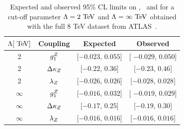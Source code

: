 \begin{table}\centering 
\begin{tabular}{cccc}
\hline
 $\Lambda [\TeV]$ & Coupling & Expected  & Observed \\
\hline
2 	& $g_1^Z$ 		& [$-0.023$, $0.055$]  & [ $-0.029$, $0.050$] \\
2 	& $\Delta \kappa_Z$ 	& [$-0.22$, $0.36$]    & [$-0.23$, $0.46$] \\
2 	& $\lambda_Z$ 	& [$-0.026$, $0.026$]  & [$-0.028$, $0.028$] \\
$\infty$ 	& $g_1^Z$ 		& [$-0.016$, $0.032$]  & [ $-0.019$, $0.029$] \\
$\infty$ 	& $\Delta \kappa_Z$ 	& [$-0.17$, $0.25$]    & [$-0.19$, $0.30$] \\
$\infty$ 	& $\lambda_Z$ 	& [$-0.016$, $0.016$]  & [$-0.016$, $0.016$] \\


\hline
\end{tabular}
\caption{Expected and observed 95\% CL limits on \dkz, \lz\ and \gz\; for a cut-off parameter $\Lambda = 2\TeV$ and $\Lambda = \infty\TeV$ obtained with the full 8 TeV dataset from ATLAS~\cite{Aad:2016ett}.}
 \label{tab:sss-WZprod-ATGC}
\end{table}
 










